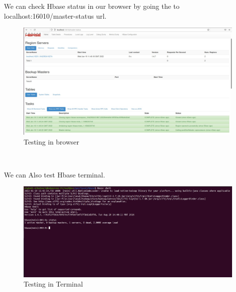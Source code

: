 \begin{spacing}{1.2}
\par We can check Hbase status in our browser by going the to localhost:16010/master-status
 url.
\\
\begin{figure}[!htb] 
\begin{center} 
\includegraphics[width=1\linewidth]{Pictures/HBase/Configuring Hbase in Standalone & Pseudo-distributed mode/Configuring Hbase in Pseudo-distributed mode/Testing in browser} 
\end{center} 
\caption{Testing in browser} 
\end{figure}  \FloatBarrier
\\
\newpage
\par We can Also test Hbase terminal.
\\
\begin{figure}[!htb] 
\begin{center} 
\includegraphics[width=1\linewidth]{Pictures/HBase/Configuring Hbase in Standalone & Pseudo-distributed mode/Configuring Hbase in Pseudo-distributed mode/Testing in Terminal} 
\end{center} 
\caption{Testing in Terminal} 
\end{figure}  \FloatBarrier
\\

\end{spacing}